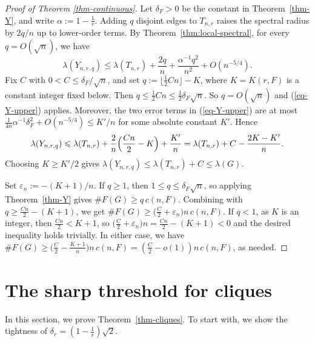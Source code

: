 \documentclass[11pt,a4paper]{article}
\theoremstyle{definition}
\theoremstyle{plain}
\newcommand{\eps}{\varepsilon}
\renewcommand{\le}{\leqslant}
\renewcommand{\ge}{\geqslant}
\begin{document}
\begin{proof}[Proof of Theorem \ref{thm-continuous}]
Let $\delta_F>0$ be the constant 
in Theorem~\ref{thm-Y}, and write 
$\alpha:=1-\tfrac1r$. Adding $q$ disjoint edges to 
$T_{n,r}$ raises the spectral radius by $2q/n$ up to 
lower-order terms. By Theorem~\ref{thm:local-spectral}, for every
$q=O(\sqrt n)$, we have 
\begin{equation} \label{eq-Y-upper}
    \lambda(Y_{n,r,q})
    \le \lambda(T_{n,r})+\frac{2q}{n}
        +\frac{\alpha^{-1}q^2}{n^2}+O(n^{-5/4}).
\end{equation} 
Fix $C$ with $0<C\le\delta_F/\sqrt n$, and set
$q:=\lfloor \frac{1}{2}Cn\rfloor-K$, where $K=K(r,F)$ is a constant integer 
fixed below. Then
$  q\le\frac{1}{2}Cn \le\frac{1}{2} \delta_F\sqrt n$. 
So $q=O(\sqrt n)$ and (\ref{eq-Y-upper}) applies. Moreover, the two
error terms in (\ref{eq-Y-upper}) are at most
$\frac{1}{4n} \alpha^{-1}\delta_F^2 +O(n^{-5/4})\le K'/n$ for
some absolute constant $K'$. Hence
\[
    \lambda(Y_{n,r,q})
    \le\lambda(T_{n,r})
       +\frac{2}{n}\Bigl(\frac{Cn}{2}-K\Bigr)+\frac{K'}{n}
    =\lambda(T_{n,r})+C-\frac{2K-K'}{n}.
\]
Choosing $K\ge K'/2$ gives
$\lambda(Y_{n,r,q})\le\lambda(T_{n,r})+C\le\lambda(G)$.

Set $\eps_n:=-(K+1)/n$. If $q\ge1$, then
$1\le q\le\delta_F\sqrt n$, so applying Theorem~\ref{thm-Y}
gives $\texttt{\#}F(G)\ge q\,c(n,F)$. Combining with 
$q\ge\frac{Cn}{2}-(K+1)$, we get 
$ \texttt{\#}F(G)\ge \big(\frac{C}{2}+\eps_n\big)
        n\,c(n,F)$.  
If $q<1$, as $K$ is an integer, then $\frac{Cn}{2}<K+1$, so
$\bigl(\frac C2+\eps_n\bigr)n=\frac{Cn}{2}-(K+1)<0$ and the desired 
inequality holds trivially. In either case, we have 
$\texttt{\#}F(G)\ge\bigl(\frac C2 - \frac{K+1}{n}\bigr)n\,c(n,F)=(\frac{C}{2} - o(1))n\, c(n,F)$, as needed. 
\end{proof} 
 




\section{The sharp threshold for cliques} 

\label{sec:clique} 

In this section, we prove Theorem~\ref{thm-cliques}. 
To start with, we show the tightness of $\delta_r= (1-\frac{1}{r})\sqrt{2}$.  

\end{document}
